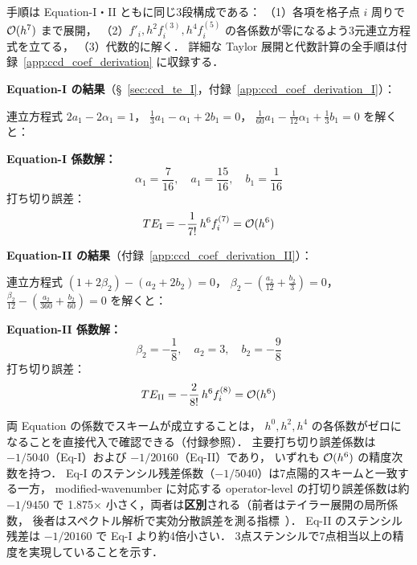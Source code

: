 手順は Equation-I・II ともに同じ3段構成である：
（1）各項を格子点 $i$ 周りで $\mathcal{O}(h^7)$ まで展開，
（2）$f'_i, h^2 f^{(3)}_i, h^4 f^{(5)}_i$ の各係数が零になるよう3元連立方程式を立てる，
（3）代数的に解く．
詳細な Taylor 展開と代数計算の全手順は付録~\ref{app:ccd_coef_derivation} に収録する．

\textbf{Equation-I の結果}（§~\ref{sec:ccd_te_I}，付録~\ref{app:ccd_coef_derivation_I}）：

連立方程式
$2a_1 - 2\alpha_1 = 1$，
$\tfrac{1}{3}a_1 - \alpha_1 + 2b_1 = 0$，
$\tfrac{1}{60}a_1 - \tfrac{1}{12}\alpha_1 + \tfrac{1}{3}b_1 = 0$
を解くと：

\textbf{Equation-I 係数解：}
\begin{equation}
  \boxed{
    \alpha_1 = \frac{7}{16},\quad
    a_1 = \frac{15}{16},\quad
    b_1 = \frac{1}{16}
  }
\end{equation}
打ち切り誤差：
\begin{equation}
  TE_{\mathrm{I}} = -\dfrac{1}{7!}\,h^6 f^{(7)}_i = \mathcal{O}(h^6)
  \label{eq:CCD_TE_I}
\end{equation}

\textbf{Equation-II の結果}（付録~\ref{app:ccd_coef_derivation_II}）：

連立方程式
$(1+2\beta_2)-(a_2+2b_2)=0$，
$\beta_2 - (\tfrac{a_2}{12}+\tfrac{b_2}{3})=0$，
$\tfrac{\beta_2}{12} - (\tfrac{a_2}{360}+\tfrac{b_2}{60})=0$
を解くと：

\textbf{Equation-II 係数解：}
\begin{equation}
  \boxed{
    \beta_2 = -\frac{1}{8},\quad
    a_2 = 3,\quad
    b_2 = -\frac{9}{8}
  }
  \label{eq:coef_CCD}
\end{equation}
打ち切り誤差：
\begin{equation}
  TE_{\mathrm{II}} = -\dfrac{2}{8!}\,h^6 f^{(8)}_i = \mathcal{O}(h^6)
  \label{eq:CCD_TE_II}
\end{equation}

両 Equation の係数でスキームが成立することは，
$h^0, h^2, h^4$ の各係数がゼロになることを直接代入で確認できる（付録参照）．
主要打ち切り誤差係数は $-1/5040$（Eq-I）および $-1/20160$（Eq-II）であり，
いずれも $\mathcal{O}(h^6)$ の精度次数を持つ．
Eq-I のステンシル残差係数（$-1/5040$）は7点陽的スキームと一致する一方，
modified-wavenumber に対応する operator-level の打切り誤差係数は約 $-1/9450$ で
1.875× 小さく，両者は\textbf{区別}される（前者はテイラー展開の局所係数，
後者はスペクトル解析で実効分散誤差を測る指標~\cite{KimMoin1985}）．
Eq-II のステンシル残差は $-1/20160$ で Eq-I より約4倍小さい．
3点ステンシルで7点相当以上の精度を実現していることを示す．

